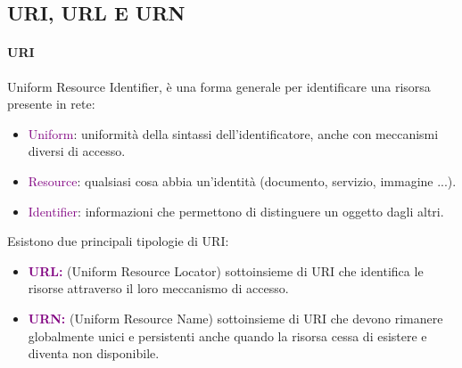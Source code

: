 \subsection{URI, URL E URN}
\paragraph{URI} Uniform Resource Identifier, è una forma generale per identificare una risorsa presente in rete:
\begin{itemize}
    \item \textcolor{purple}{Uniform}: uniformità della sintassi dell’identificatore, anche con meccanismi diversi di accesso.
    \item \textcolor{purple}{Resource}: qualsiasi cosa abbia un'identità (documento, servizio, immagine ...).
    \item \textcolor{purple}{Identifier}: informazioni che permettono di distinguere un oggetto dagli altri.
\end{itemize} 
Esistono due principali tipologie di URI:
\begin{itemize}
    \item \textbf{\textcolor{purple}{URL:}} (Uniform Resource Locator) sottoinsieme di URI che identifica  le risorse attraverso il loro meccanismo di accesso.
    \item \textbf{\textcolor{purple}{URN:}} (Uniform Resource Name) sottoinsieme di URI che devono rimanere globalmente unici e persistenti anche quando la risorsa cessa di esistere e diventa non disponibile.
\end{itemize}

